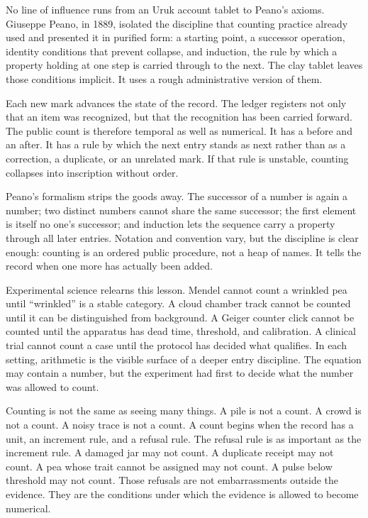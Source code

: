 No line of influence runs from an Uruk account tablet to Peano's axioms.
Giuseppe Peano, in 1889, isolated the discipline that counting practice
already used and presented it in purified form: a starting point, a
successor operation, identity conditions that prevent collapse, and
induction, the rule by which a property holding at one step is carried
through to the next. The clay tablet leaves those conditions implicit. It
uses a rough administrative version of them.

Each new mark advances the state of the record. The ledger registers not
only that an item was recognized, but that the recognition has been carried
forward. The public count is therefore temporal as well as numerical. It has
a before and an after. It has a rule by which the next entry stands as next
rather than as a correction, a duplicate, or an unrelated mark. If that rule
is unstable, counting collapses into inscription without order.

Peano's formalism strips the goods away. The successor of a number is again
a number; two distinct numbers cannot share the same successor; the first
element is itself no one's successor; and induction lets the sequence carry
a property through all later entries. Notation and convention vary, but the
discipline is clear enough: counting is an ordered public procedure, not a
heap of names. It tells the record when one more has actually been added.

Experimental science relearns this lesson. Mendel cannot count a wrinkled
pea until ``wrinkled'' is a stable category. A cloud chamber track cannot
be counted until it can be distinguished from background. A Geiger counter
click cannot be counted until the apparatus has dead time, threshold, and
calibration. A clinical trial cannot count a case until the protocol has
decided what qualifies. In each
setting, arithmetic is the visible surface of a deeper entry discipline.
The equation may contain a number, but the experiment had first to decide
what the number was allowed to count.

Counting is not the same as seeing many things. A pile is not a count. A
crowd is not a count. A noisy trace is not a count. A count begins when the
record has a unit, an increment rule, and a refusal rule. The refusal rule
is as important as the increment rule. A damaged jar may not count. A
duplicate receipt may not count. A pea whose trait cannot be assigned may
not count. A pulse below threshold may not count. Those refusals are not
embarrassments outside the evidence. They are the conditions under which
the evidence is allowed to become numerical.

